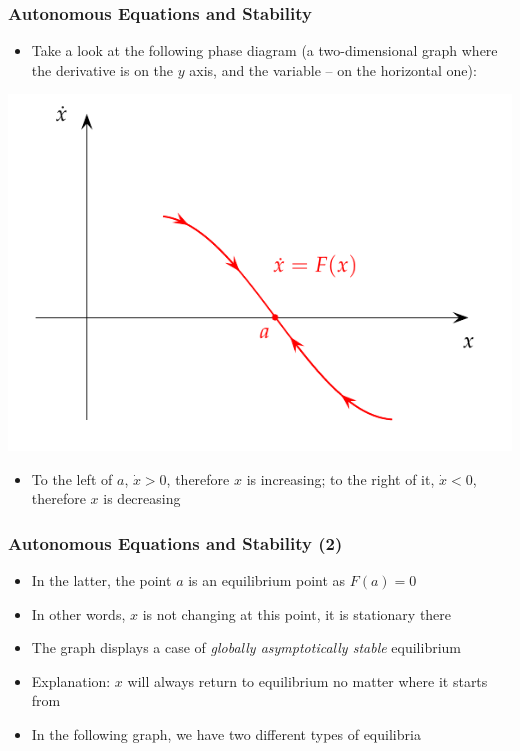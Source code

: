 \documentclass[10pt,usenames,dvipsnames]{beamer}
\theoremstyle{definition}
\begin{document}
\begin{frame}[fragile]
\frametitle{Autonomous Equations and Stability}
\begin{itemize}
	\item Take a look at the following phase diagram (a two-dimensional graph where the derivative is on the $y$ axis, and the variable -- on the horizontal one):
\end{itemize}
\begin{center}
	\includegraphics[scale=0.5]{graphs/phase1}
\end{center}
\begin{itemize}
	\item To the left of $a$, $\dot{x} > 0$, therefore $x$ is increasing; to the right of it, $\dot{x} < 0$, therefore $x$ is decreasing
\end{itemize}
\end{frame}

\begin{frame}[fragile]
\frametitle{Autonomous Equations and Stability (2)}
\begin{itemize}
	\item In the latter, the point $a$ is an equilibrium point as $F(a) = 0$
	\item In other words, $x$ is not changing at this point, it is stationary there
	\item The graph displays a case of \textit{globally asymptotically stable} equilibrium
	\item Explanation: $x$ will always return to equilibrium no matter where it starts from
	\item In the following graph, we have two different types of equilibria
\end{itemize}
\end{frame}
\end{document}
